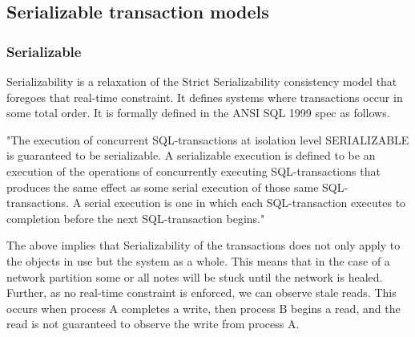 \documentclass[a4paper,10pt,titlepage]{report}
\begin{document}
    \subsection{Serializable transaction models}

    \subsubsection{Serializable}

    Serializability is a relaxation of the Strict Serializability consistency model that foregoes that real-time constraint. It defines systems where transactions occur in some total order. It is formally defined in the ANSI SQL 1999 spec as follows.
    
    \begin{displayquote}
    "The execution of concurrent SQL-transactions at isolation level SERIALIZABLE is guaranteed to be serializable. A serializable execution is defined to be an execution of the operations of concurrently executing SQL-transactions that produces the same effect as some serial execution of those same SQL-transactions. A serial execution is one in which each SQL-transaction executes to completion before the next SQL-transaction begins."\cite{ansisql1999}\\
    \end{displayquote}
    \vspace{5mm}

    The above implies that Serializability of the transactions does not only apply to the objects in use but the system as a whole. This means that in the case of a network partition some or all notes will be stuck until the network is healed. Further, as no real-time constraint is enforced,  we can observe stale reads. This occurs when process A completes a write, then process B begins a read, and the read is not guaranteed to observe the write from process A.
    \\ \vspace{5mm}
\end{document}
